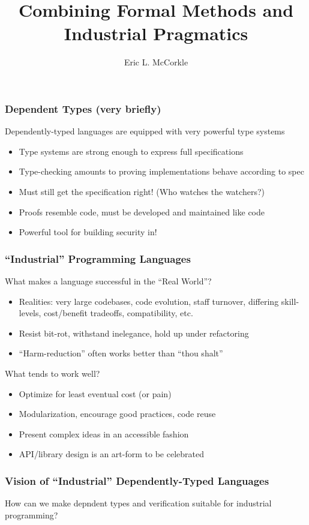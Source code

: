 \documentclass{beamer}
\title{Combining Formal Methods and Industrial Pragmatics}
\author{Eric L. McCorkle}
\begin{document}
\begin{frame}
  \titlepage
\end{frame}

\begin{frame}
  \frametitle{Dependent Types (very briefly)}
  Dependently-typed languages are equipped with very powerful type systems
  \begin{itemize}
    \item Type systems are strong enough to express full specifications
    \item Type-checking amounts to proving implementations behave
      according to spec
    \item Must still get the specification right!  (Who watches the
      watchers?)
    \item Proofs resemble code, must be developed and maintained like code
    \item Powerful tool for building security in!
  \end{itemize}
\end{frame}

\begin{frame}
  \frametitle{``Industrial'' Programming Languages}
  What makes a language successful in the ``Real World''?
  \begin{itemize}
    \item Realities: very large codebases, code evolution, staff
      turnover, differing skill-levels, cost/benefit tradeoffs,
      compatibility, etc.
    \item Resist bit-rot, withstand inelegance, hold up under refactoring
    \item ``Harm-reduction'' often works better than ``thou shalt''
  \end{itemize}
  What tends to work well?
  \begin{itemize}
    \item Optimize for least eventual cost (or pain)
    \item Modularization, encourage good practices, code reuse
    \item Present complex ideas in an accessible fashion
    \item API/library design is an art-form to be celebrated
  \end{itemize}
\end{frame}

\begin{frame}
  \frametitle{Vision of ``Industrial'' Dependently-Typed Languages}
  How can we make depndent types and verification suitable for
  industrial programming?
\end{frame}
\end{document}
